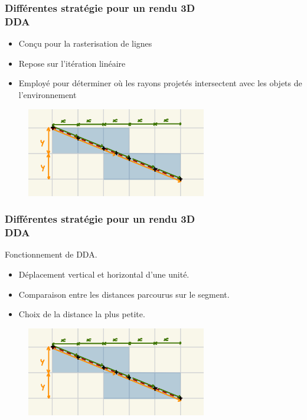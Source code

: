 \documentclass{beamer}
\begin{document}
\begin{frame}
    \frametitle{Différentes stratégie pour un rendu 3D \\
                \small DDA}           
    \begin{block}{}
        \begin{itemize}
            \item Conçu pour la rasterisation de lignes
            \item Repose sur l'itération linéaire
            \item Employé pour déterminer où les rayons projetés intersectent avec les objets de l'environnement
        \end{itemize}
    \end{block}    
    \begin{figure}
        \centering
        \includegraphics[width=0.7\textwidth]{images/DDA 0.jpg}
    \end{figure}
\end{frame}

\begin{frame}
    \frametitle{Différentes stratégie pour un rendu 3D \\
                \small DDA}           
    \begin{block}{Fonctionnement de DDA.}
        \begin{itemize}
            \item Déplacement vertical et horizontal d'une unité.
            \item Comparaison entre les distances parcourus sur le segment.
            \item Choix de la distance la plus petite.
        \end{itemize}
    \end{block}    
    \begin{figure}
        \centering
        \includegraphics[width=0.7\textwidth]{images/DDA 0.jpg}
    \end{figure}
\end{frame}
\end{document}
